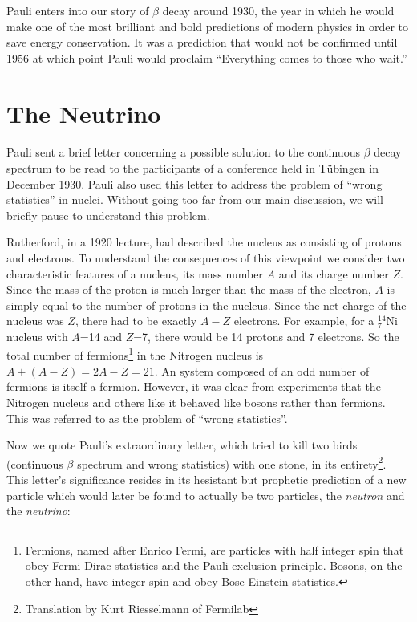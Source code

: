\documentclass[a4paper,12pt]{book}
\begin{document}
Pauli enters into our story of $\beta$ decay around 1930, the year in which he would make one of the most brilliant and bold predictions of modern physics in order to save energy conservation. It was a prediction that would not be confirmed until 1956\cite{cowan} at which point Pauli would proclaim ``Everything comes to those who wait.''

\section{The Neutrino}

\paragraph*{}Pauli sent a brief letter concerning a possible solution to the continuous $\beta$ decay spectrum to be read to the participants of a conference held in T\"{u}bingen in December 1930. Pauli also used this letter to address the problem of ``wrong statistics'' in nuclei. Without going too far from our main discussion, we will briefly pause to understand this problem. 

Rutherford, in a 1920 lecture\cite{rutherford}, had described the nucleus as consisting of protons and electrons. To understand the consequences of this viewpoint we consider two characteristic features of a nucleus, its mass number $A$ and its charge number $Z$. Since the mass of the proton is much larger than the mass of the electron, $A$ is simply equal to the number of protons in the nucleus. Since the net charge of the nucleus was $Z$, there had to be exactly $A-Z$ electrons. For example, for a $^{14}_{7}$Ni nucleus with $A$=14 and $Z$=7, there would be 14 protons and 7 electrons. So the total number of fermions\footnote{Fermions, named after Enrico Fermi, are particles with half integer spin that obey Fermi-Dirac statistics and the Pauli exclusion principle. Bosons, on the other hand, have integer spin and obey Bose-Einstein statistics.} in the Nitrogen nucleus is $A+(A-Z)=2A-Z=21$. An system composed of an odd number of fermions is itself a fermion. However, it was clear from experiments that the Nitrogen nucleus and others like it behaved like bosons rather than fermions. This was referred to as the problem of ``wrong statistics''\cite{brandt}.

Now we quote Pauli's extraordinary letter, which tried to kill two birds (continuous $\beta$ spectrum and wrong statistics) with one stone, in its entirety\footnote{Translation by Kurt Riesselmann of Fermilab}. This letter's significance resides in its hesistant but prophetic prediction of a new particle which would later be found to actually be two particles, the \textit{neutron} and the \textit{neutrino}:
\end{document}
